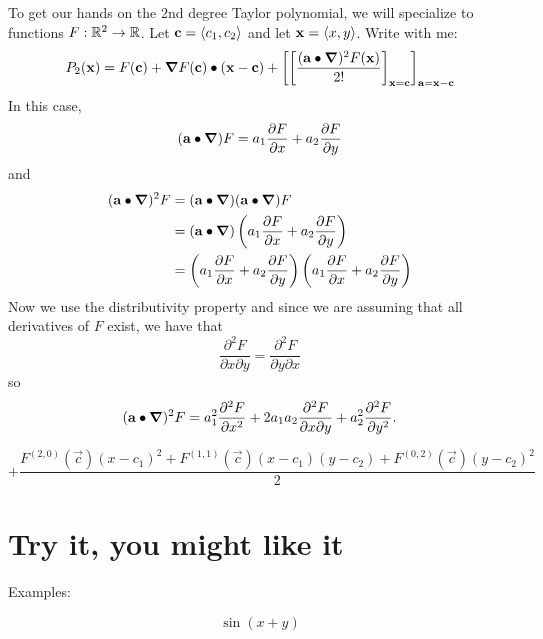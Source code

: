 \documentclass{ximera}
\begin{document}
To get our hands on the $2$nd degree Taylor polynomial, we will
specialize to functions $F:\R^2\to\R$. Let $\vec{c}=\vector{c_1,c_2}$
and let $\vec{x} = \vector{x,y}$.
Write with me:
\[
P_2(\vec{x}) = F(\vec{c})
+ \grad F(\vec{c})\dotp (\vec{x}-\vec{c})
+\eval{\eval{\frac{(\vec{a}\dotp \grad)^2 F(\vec{x})}{2!}}_{\vec{x}=\vec{c}}}_{\vec{a}=\vec{x}-\vec{c}}
\]
In this case,
\[
(\vec{a}\dotp\grad)F = a_1 \pp[F]{x} + a_2 \pp[F]{y}
\]
and 
\begin{align*}
(\vec{a}\dotp\grad)^2F &=(\vec{a}\dotp\grad)(\vec{a}\dotp\grad)F\\
  &= (\vec{a}\dotp\grad)\left(a_1 \pp[F]{x} + a_2 \pp[F]{y}\right)\\
  &= \left(a_1 \pp[F]{x} + a_2 \pp[F]{y}\right)\left(a_1 \pp[F]{x} + a_2 \pp[F]{y}\right)
\end{align*}
Now we use the distributivity property and since we are assuming that
all derivatives of $F$ exist, we have that
\[
\frac{\partial^2F}{\partial x\partial y}  = \frac{\partial^2F}{\partial y\partial x}
\]
so
\[
(\vec{a}\dotp\grad)^2F = a_1^2\frac{\partial^2F}{\partial x^2} + 2a_1
a_2\frac{\partial^2F}{\partial x\partial y} +
a_2^2\frac{\partial^2F}{\partial y^2}.
\]



\[
+ \frac{F^{(2,0)}(\vec{c}) (x-c_1)^2 + F^{(1,1)}(\vec{c})(x-c_1)(y-c_2)  + F^{(0,2)}(\vec{c})(y-c_2)^2}{2}
\]


\section{Try it, you might like it}

Examples:

\[
\sin(x+ y)
\]
\end{document}
